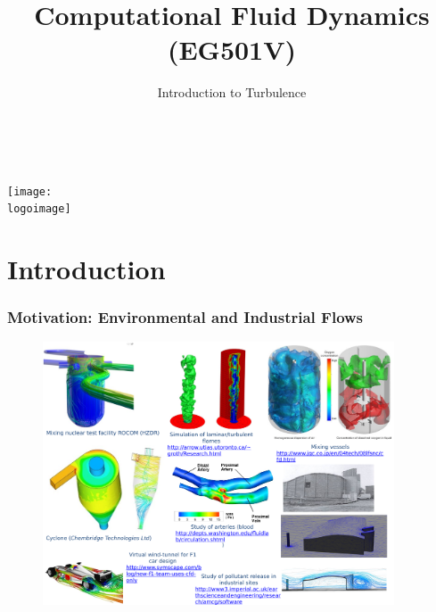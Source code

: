 \documentclass[10pt,compress,handout,ignorenonframetext]{beamer}
\institute{School of Engineering}
\title{Computational Fluid Dynamics (EG501V)}
\subtitle{Introduction to Turbulence}
\date[]{}
\author[\shortname]{%
  \fullname\\\ttfamily{\emailaddress}
}
\newcommand{\logoimage}{./FigBanner/UoAHorizBanner}
\begin{document}
\begin{frame}
  \titlepage
  \vfill%
  \begin{center}
    \texttt{[image: \\logoimage]}
  \end{center}
\end{frame}





\section{Introduction}

\begin{frame}
 \frametitle{Motivation: Environmental and Industrial Flows}

   \begin{figure}%
    \begin{center}
     \includegraphics[width=12.cm, height=7.8cm, clip]{./Figs/SpecificIndustrialEnvironmentalApplication2}
    \end{center}
   \end{figure}    

\end{frame}
 
\end{document}
